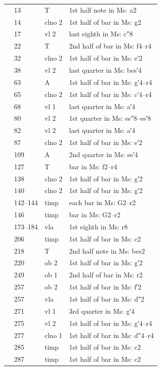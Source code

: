 \documentclass[parskip=full]{scrreprt}
\begin{document}
\begin{longtable}{lll L{10cm}}
	  & 13  & T       & 1st half note in Ms: a2 \\
	  & 14  & clno 2  & 1st half of bar in Ms: g2 \\
	  & 17  & vl 2    & last eighth in Ms: c″8 \\
	  & 22  & T       & 2nd half of bar in Ms: f4–r4 \\
	  & 32  & clno 2  & 1st half of bar in Ms: e′2 \\
	  & 38  & vl 2    & last quarter in Ms: bes′4 \\
	  & 63  & A       & 1st half of bar in Ms: g′4–r4 \\
	  & 65  & clno 2  & 1st half of bar in Ms: c′4–r4 \\
	  & 68  & vl 1    & last quarter in Ms: a′4 \\
	  & 80  & vl 2    & 1st quarter in Ms: es″8–es′8 \\
	  & 82  & vl 2    & last quarter in Ms: a′4 \\
	  & 87  & clno 2  & 1st half of bar in Ms: e′2 \\
	  & 109 & A       & 2nd quarter in Ms: es′4 \\
	  & 127 & T       & bar in Ms: f2–r4 \\
	  & 138 & clno 2  & 1st half of bar in Ms: g′2 \\
	  & 140 & clno 2  & 1st half of bar in Ms: g′2 \\
	  & 142–144 & timp & each bar in Ms: G2–r2 \\
	  & 146 & timp    & bar in Ms: G2–r2 \\
	  & 173–184 & vla & 1st eighth in Ms: r8 \\
	  & 206 & timp    & 1st half of bar in Ms: c2 \\
	  & 218 & T       & 2nd half note in Ms: bes2 \\
	  & 220 & ob 2    & 1st half of bar in Ms: g′2 \\
	  & 249 & ob 1    & 2nd half of bar in Ms: r2 \\
	  & 257 & ob 2    & 1st half of bar in Ms: f′2 \\
	  & 257 & vla     & 1st half of bar in Ms: d″2 \\
	  & 271 & vl 1    & 3rd quarter in Ms: g′4 \\
	  & 275 & vl 2    & 1st half of bar in Ms: g′4–r4 \\
	  & 277 & clno 1  & 1st half of bar in Ms: d″4–r4 \\
	  & 285 & timp    & 1st half of bar in Ms: c2 \\
	  & 287 & timp    & 1st half of bar in Ms: c2 \\

\end{longtable}
\end{document}
